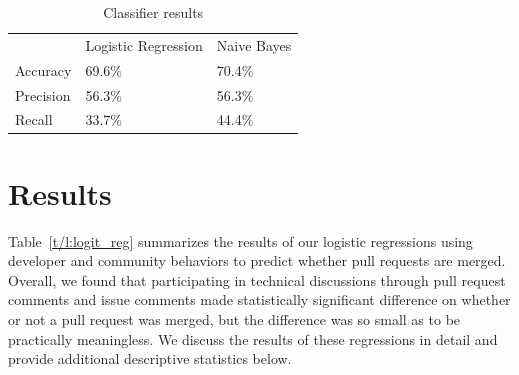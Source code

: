 \documentclass{sigchi}
\begin{document}
\begin{table}[ht] \centering
  \caption{Classifier results}
  \label{tbl:classifiers}
  \begin{tabular}{lll}
  \hline\hline
  ~         & Logistic Regression & Naive Bayes \\
  Accuracy  & 69.6\%              & 70.4\%      \\
  Precision & 56.3\%              & 56.3\%      \\
  Recall    & 33.7\%              & 44.4\%      \\
  \hline
  \end{tabular}
\end{table}

\section{Results} \label{chap:results}
Table~\ref{t/l:logit_reg} summarizes the results of our logistic regressions 
using developer and community behaviors to predict whether pull requests are 
merged. Overall, we found that participating in technical discussions through 
pull request comments and issue comments made statistically significant 
difference on whether or not a pull request was merged, but the difference was 
so small as to be practically meaningless. We discuss the results of these 
regressions in detail and provide additional descriptive statistics below.
\end{document}
